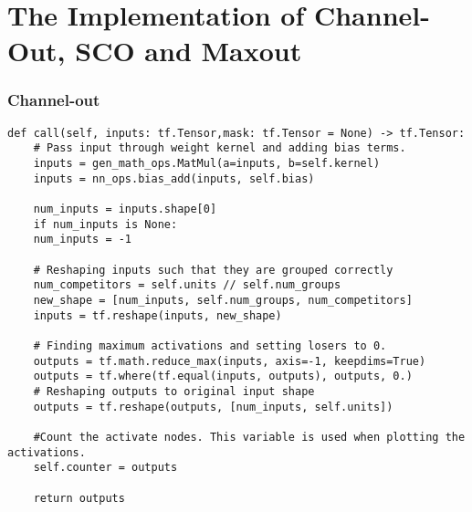 \section{The Implementation of Channel-Out, \ac{SCO} and Maxout}\label{sec:TFImp}
\subsubsection*{Channel-out}
\lstset{style=Python}
\begin{lstlisting}[caption={Python implementation for the custom activation function used to define the channel-out layer.},captionpos=b, label={lst:channel_out}]
def call(self, inputs: tf.Tensor,mask: tf.Tensor = None) -> tf.Tensor:
    # Pass input through weight kernel and adding bias terms.
    inputs = gen_math_ops.MatMul(a=inputs, b=self.kernel)
    inputs = nn_ops.bias_add(inputs, self.bias)

    num_inputs = inputs.shape[0]
    if num_inputs is None:
    num_inputs = -1

    # Reshaping inputs such that they are grouped correctly
    num_competitors = self.units // self.num_groups
    new_shape = [num_inputs, self.num_groups, num_competitors]
    inputs = tf.reshape(inputs, new_shape)

    # Finding maximum activations and setting losers to 0.
    outputs = tf.math.reduce_max(inputs, axis=-1, keepdims=True)
    outputs = tf.where(tf.equal(inputs, outputs), outputs, 0.)
    # Reshaping outputs to original input shape
    outputs = tf.reshape(outputs, [num_inputs, self.units])

    #Count the activate nodes. This variable is used when plotting the activations.
    self.counter = outputs

    return outputs 
\end{lstlisting}


